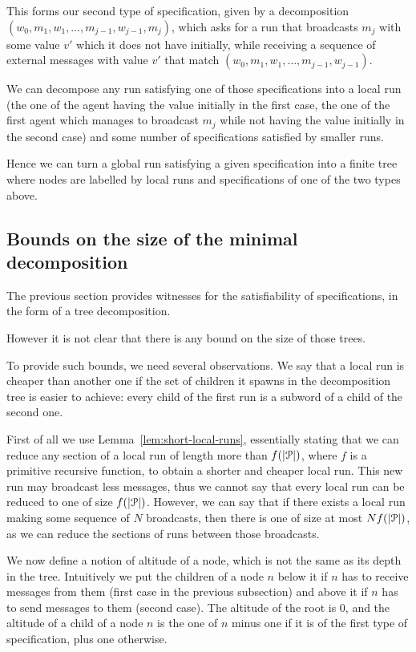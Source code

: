 \begin{itemize}
	This forms our second type of specification, given by a decomposition $(w_0, m_1, w_1, \ldots, m_{j-1}, w_{j-1}, m_j)$, which asks for a run that broadcasts $m_j$ with some value $v'$ which it does not have initially, while receiving a sequence of  external messages with value $v'$ that match $(w_0, m_1, w_1, \ldots, m_{j-1}, w_{j-1})$.
\end{itemize}   

We can decompose any run satisfying one of those specifications into a local run (the one of the agent having the value initially in the first case, the one of the first agent which manages to broadcast $m_j$ while not having the value initially in the second case) and some number of specifications satisfied by smaller runs.

Hence we can turn a global run satisfying a given specification into a finite tree where nodes are labelled by local runs and specifications of one of the two types above.

\subsection{Bounds on the size of the minimal decomposition}

The previous section provides witnesses for the satisfiability of specifications, in the form of a tree decomposition.

However it is not clear that there is any bound on the size of those trees.

To provide such bounds, we need several observations.
We say that a local run is cheaper than another one if the set of children it spawns in the decomposition tree is easier to achieve: every child of the first run is a subword of a child of the second one.

 First of all we use Lemma~\ref{lem:short-local-runs}, essentially stating that we can reduce any section of a local run of length more than $f(|\mathcal{P}|)$, where $f$ is a primitive recursive function, to obtain a shorter and cheaper local run.
 This new run may broadcast less messages, thus we cannot say that every local run can be reduced to one of size $f(|\mathcal{P}|)$.
 However, we can say that if there exists a local run making some sequence of $N$ broadcasts, then there is one of size at most $Nf(|\mathcal{P}|)$, as we can reduce the sections of runs between those broadcasts.
 
 We now define a notion of altitude of a node, which is not the same as its depth in the tree. Intuitively we put the children of a node $n$ below it if $n$ has to receive messages from them (first case in the previous subsection) and above it if $n$ has to send messages to them (second case).
 The altitude of the root is $0$, and the altitude of a child of a node $n$  is  the one of $n$ minus one if it is of the first type of specification, plus one otherwise.
 
